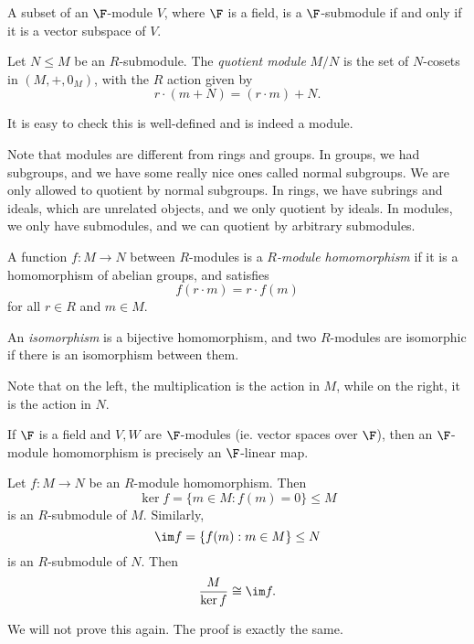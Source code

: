 \documentclass[a4paper]{article}
\begin{document}
\begin{eg}
  A subset of an $\F$-module $V$, where $\F$ is a field, is a $\F$-submodule if and only if it is a vector subspace of $V$.
\end{eg}

\begin{defi}
  Let $N \leq M$ be an $R$-submodule. The \emph{quotient module} $M/N$ is the set of $N$-cosets in $(M, +, 0_M)$, with the $R$ action given by
  \[
    r\cdot (m + N) = (r\cdot m) + N.
  \]
\end{defi}
It is easy to check this is well-defined and is indeed a module.

Note that modules are different from rings and groups. In groups, we had subgroups, and we have some really nice ones called normal subgroups. We are only allowed to quotient by normal subgroups. In rings, we have subrings and ideals, which are unrelated objects, and we only quotient by ideals. In modules, we only have submodules, and we can quotient by arbitrary submodules.

\begin{defi}
  A function $f: M \to N$ between $R$-modules is a \emph{$R$-module homomorphism} if it is a homomorphism of abelian groups, and satisfies
  \[
    f(r \cdot m) = r \cdot f(m)
  \]
  for all $r \in R$ and $m \in M$.

  An \emph{isomorphism} is a bijective homomorphism, and two $R$-modules are isomorphic if there is an isomorphism between them.
\end{defi}
Note that on the left, the multiplication is the action in $M$, while on the right, it is the action in $N$.

\begin{eg}
  If $\F$ is a field and $V, W$ are $\F$-modules (ie. vector spaces over $\F$), then an $\F$-module homomorphism is precisely an $\F$-linear map.
\end{eg}

\begin{thm}
  Let $f: M \to N$ be an $R$-module homomorphism. Then
  \[
    \ker f = \{m \in M: f(m) = 0\} \leq M
  \]
  is an $R$-submodule of $M$. Similarly,
  \[
    \im f = \{f(m): m \in M\}\leq N
  \]
  is an $R$-submodule of $N$. Then
  \[
    \frac{M}{\ker f} \cong \im f.
  \]
\end{thm}

We will not prove this again. The proof is exactly the same.
\end{document}
